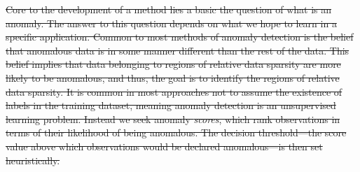     \st{Core to the 
    development of a method lies a basic the question of what is an anomaly.  
    The answer to this question depends on what we hope to
    learn in a specific application. Common to most 
    methods of anomaly detection is the belief that anomalous data is in some 
    manner different than the rest of the data. This belief implies that data 
    belonging to regions of relative data sparsity are more likely to be 
    anomalous, and thus, the goal is to identify the regions of relative 
    data sparsity. It is common in most approaches not to assume the existence 
    of labels in the training dataset, meaning anomaly detection is an 
    unsupervised learning problem.  Instead we seek anomaly \emph{scores}, 
    which rank observations in terms of their likelihood of being anomalous.  The 
    decision threshold---the score value above which observations would be 
    declared anomalous---is then set heuristically.}








